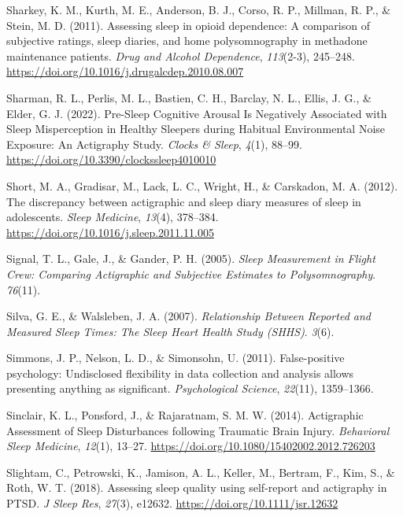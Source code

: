 \documentclass[
]{article}
\newlength{\cslhangindent}
\newenvironment{CSLReferences}[2] %
 {\begin{list}{}{%
  \setlength{\itemindent}{0pt}
  \setlength{\leftmargin}{0pt}
  \setlength{\parsep}{0pt}
  \ifodd #1
   \setlength{\leftmargin}{\cslhangindent}
   \setlength{\itemindent}{-1\cslhangindent}
  \fi
  \setlength{\itemsep}{#2\baselineskip}}}
 {\end{list}}
\begin{document}
\begin{CSLReferences}{1}{0}
Sharkey, K. M., Kurth, M. E., Anderson, B. J., Corso, R. P., Millman, R. P., \& Stein, M. D. (2011). Assessing sleep in opioid dependence: {A} comparison of subjective ratings, sleep diaries, and home polysomnography in methadone maintenance patients. \emph{Drug and Alcohol Dependence}, \emph{113}(2-3), 245--248. \url{https://doi.org/10.1016/j.drugalcdep.2010.08.007}

Sharman, R. L., Perlis, M. L., Bastien, C. H., Barclay, N. L., Ellis, J. G., \& Elder, G. J. (2022). Pre-{Sleep} {Cognitive} {Arousal} {Is} {Negatively} {Associated} with {Sleep} {Misperception} in {Healthy} {Sleepers} during {Habitual} {Environmental} {Noise} {Exposure}: {An} {Actigraphy} {Study}. \emph{Clocks \& Sleep}, \emph{4}(1), 88--99. \url{https://doi.org/10.3390/clockssleep4010010}

Short, M. A., Gradisar, M., Lack, L. C., Wright, H., \& Carskadon, M. A. (2012). The discrepancy between actigraphic and sleep diary measures of sleep in adolescents. \emph{Sleep Medicine}, \emph{13}(4), 378--384. \url{https://doi.org/10.1016/j.sleep.2011.11.005}

Signal, T. L., Gale, J., \& Gander, P. H. (2005). \emph{Sleep {Measurement} in {Flight} {Crew}: {Comparing} {Actigraphic} and {Subjective} {Estimates} to {Polysomnography}}. \emph{76}(11).

Silva, G. E., \& Walsleben, J. A. (2007). \emph{Relationship {Between} {Reported} and {Measured} {Sleep} {Times}: {The} {Sleep} {Heart} {Health} {Study} ({SHHS})}. \emph{3}(6).

Simmons, J. P., Nelson, L. D., \& Simonsohn, U. (2011). False-positive psychology: Undisclosed flexibility in data collection and analysis allows presenting anything as significant. \emph{Psychological Science}, \emph{22}(11), 1359--1366.

Sinclair, K. L., Ponsford, J., \& Rajaratnam, S. M. W. (2014). Actigraphic {Assessment} of {Sleep} {Disturbances} following {Traumatic} {Brain} {Injury}. \emph{Behavioral Sleep Medicine}, \emph{12}(1), 13--27. \url{https://doi.org/10.1080/15402002.2012.726203}

Slightam, C., Petrowski, K., Jamison, A. L., Keller, M., Bertram, F., Kim, S., \& Roth, W. T. (2018). Assessing sleep quality using self-report and actigraphy in {PTSD}. \emph{J Sleep Res}, \emph{27}(3), e12632. \url{https://doi.org/10.1111/jsr.12632}


\end{CSLReferences}
\end{document}
